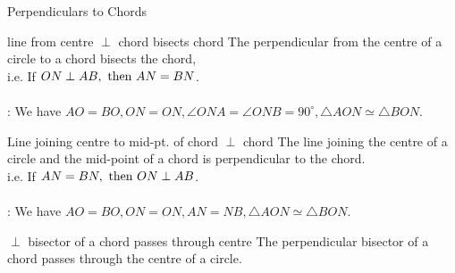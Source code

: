 
\begin{mysubsection}{Perpendiculars to Chords}
    \begin{theorem}[thm:]{line from centre $\perp$ chord bisects chord}
        The perpendicular from the centre of a circle to a chord bisects the chord, \\
        i.e. If $ON\perp AB,\textnormal{ then }AN=BN$.
        \\\\: 
        We have $AO=BO, ON=ON, \angle ONA=\angle ONB=90^{\circ}, \triangle AON\simeq \triangle BON$.
    \end{theorem}
    \mynewpage

    \begin{theorem}[thm:]{Line joining centre to mid-pt. of chord $\perp $ chord}
        The line joining the centre of a circle and the mid-point of a chord is perpendicular to the chord.\\
        i.e. If $AN=BN,\textnormal{ then }ON\perp AB$.
        \\\\ : 
        We have $AO=BO, ON=ON, AN=NB, \triangle AON\simeq \triangle BON$.
    \end{theorem}
    \vspace{1em}

    \begin{theorem}[thm:]{$\perp $ bisector of a chord passes through centre}
        The perpendicular bisector of a chord passes through the centre of a circle.
    \end{theorem}
    \vspace{3em}
\end{mysubsection}


